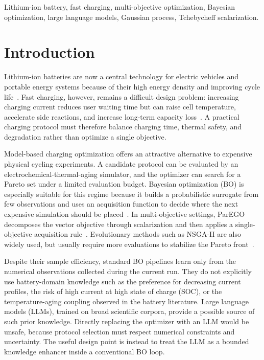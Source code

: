 \documentclass[journal]{IEEEtran}
\begin{document}
\begin{IEEEkeywords}
Lithium-ion battery, fast charging, multi-objective optimization,
Bayesian optimization, large language models, Gaussian process,
Tchebycheff scalarization.
\end{IEEEkeywords}

\IEEEpeerreviewmaketitle

\section{Introduction}
\label{sec:introduction}

Lithium-ion batteries are now a central technology for electric vehicles and
portable energy systems because of their high energy density and improving
cycle life~\cite{ref1}. Fast charging, however, remains a difficult design
problem: increasing charging current reduces user waiting time but can raise
cell temperature, accelerate side reactions, and increase long-term capacity
loss~\cite{ref2}. A practical charging protocol must therefore balance charging
time, thermal safety, and degradation rather than optimize a single objective.

Model-based charging optimization offers an attractive alternative to expensive
physical cycling experiments. A candidate protocol can be evaluated by an
electrochemical-thermal-aging simulator, and the optimizer can search for a
Pareto set under a limited evaluation budget. Bayesian optimization (BO) is
especially suitable for this regime because it builds a probabilistic surrogate
from few observations and uses an acquisition function to decide where the next
expensive simulation should be placed~\cite{ref3}. In multi-objective settings,
ParEGO decomposes the vector objective through scalarization and then applies a
single-objective acquisition rule~\cite{ref4}. Evolutionary methods such as
NSGA-II are also widely used, but usually require more evaluations to stabilize
the Pareto front~\cite{ref5}.

Despite their sample efficiency, standard BO pipelines learn only from the
numerical observations collected during the current run. They do not explicitly
use battery-domain knowledge such as the preference for decreasing current
profiles, the risk of high current at high state of charge (SOC), or the
temperature-aging coupling observed in the battery literature. Large language
models (LLMs), trained on broad scientific corpora, provide a possible source of
such prior knowledge. Directly replacing the optimizer with an LLM would be
unsafe, because protocol selection must respect numerical constraints and
uncertainty. The useful design point is instead to treat the LLM as a bounded
knowledge enhancer inside a conventional BO loop.
\end{document}
